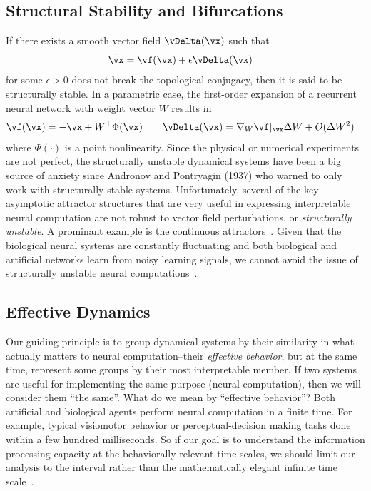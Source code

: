 \documentclass{article}
\theoremstyle{definition} \newtheorem{definition}{Definition}  \newtheorem{example}{Example}
\theoremstyle{remark} \newtheorem{remark}{Remark}
\newcounter{ct}
\begin{document}
\subsection{Structural Stability and Bifurcations}
If there exists a smooth vector field $\vDelta(\vx)$ such that
\begin{align}\label{eq:vfp:epsilon}
\dot{\vx} &= \vf(\vx) + \epsilon\vDelta(\vx)
\end{align}
for some $\epsilon > 0$ does not break the topological conjugacy, then it is said to be structurally stable.
In a parametric case, 
the first-order expansion of a recurrent neural network with weight vector $W$ results in
\begin{align}
	\vf(\vx) = -\vx + W^\top\Phi(\vx)
	&\qquad
	\vDelta(\vx) = \nabla_W \vf\vert_\vx \Delta W + O(\Delta W^2)
\end{align}
where $\Phi(\cdot)$ is a point nonlinearity.
Since the physical or numerical experiments are not perfect, the structurally unstable dynamical systems have been a big source of anxiety since Andronov and Pontryagin (1937) who warned to only work with structurally stable systems.
Unfortunately, several of the key asymptotic attractor structures that are very useful in expressing interpretable neural computation are not robust to vector field perturbations, or \emph{structurally unstable}.
A prominant example is the continuous attractors~\citep{Sagodi2024a}.
Given that the biological neural systems are constantly fluctuating and both biological and artificial networks learn from noisy learning signals, we cannot avoid the issue of structurally unstable neural computations~\citep{Park2023a}.

\subsection{Effective Dynamics}
Our guiding principle is to group dynamical systems by their similarity in what actually matters to neural computation--their \emph{effective behavior}, but at the same time, represent some groups by their most interpretable member.
If two systems are useful for implementing the same purpose (neural computation), then we will consider them ``the same''.
What do we mean by ``effective behavior''?
Both artificial and biological agents perform neural computation in a finite time.
For example, typical visiomotor behavior or perceptual-decision making tasks done within a few hundred milliseconds.
So if our goal is to understand the information processing capacity at the behaviorally relevant time scales, we should limit our analysis to the interval rather than the mathematically elegant infinite time scale~\citep{Park2023a}.
\end{document}

